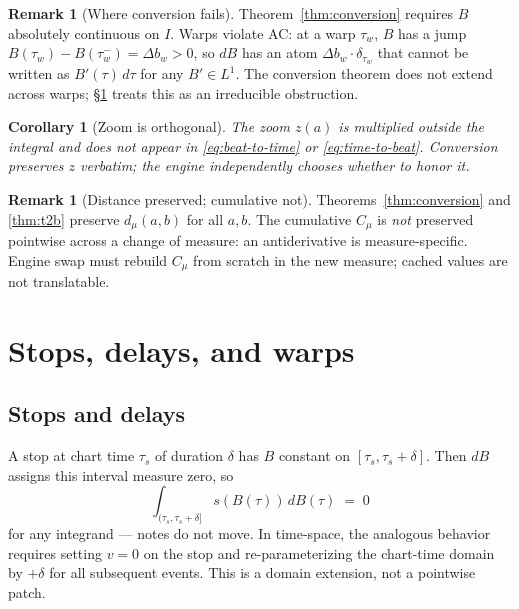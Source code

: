 \documentclass[11pt]{article}
\newtheorem{corollary}[theorem]{Corollary}
\theoremstyle{definition}
\newtheorem{remark}[theorem]{Remark}
\newcommand{\dB}{\,dB}
\newcommand{\dtau}{\,d\tau}
\newcommand{\Lone}{L^{1}}
\begin{document}
\begin{remark}[Where conversion fails]
\label{rem:conv-fails}
Theorem~\ref{thm:conversion} requires $B$ absolutely continuous on $I$.
Warps violate AC: at a warp $\tau_w$, $B$ has a jump
$B(\tau_w) - B(\tau_w^-) = \Delta b_w > 0$, so $dB$ has an atom
$\Delta b_w \cdot \delta_{\tau_w}$ that cannot be written as $B'(\tau)\dtau$
for any $B' \in \Lone$. The conversion theorem does not extend across warps;
\S\ref{sec:stops-warps} treats this as an irreducible obstruction.
\end{remark}

\begin{corollary}[Zoom is orthogonal]
\label{cor:z-ortho}
The zoom $z(a)$ is multiplied outside the integral and does not appear in
\eqref{eq:beat-to-time} or \eqref{eq:time-to-beat}. Conversion preserves $z$
verbatim; the engine independently chooses whether to honor it.
\end{corollary}

\begin{remark}[Distance preserved; cumulative not]
\label{rem:cum-not-invariant}
Theorems~\ref{thm:conversion} and \ref{thm:t2b} preserve $d_\mu(a, b)$ for all
$a, b$. The cumulative $C_\mu$ is \emph{not} preserved pointwise across a
change of measure: an antiderivative is measure-specific. Engine swap must
rebuild $C_\mu$ from scratch in the new measure; cached values are not
translatable.
\end{remark}

\section{Stops, delays, and warps}
\label{sec:stops-warps}

\subsection{Stops and delays}

A stop at chart time $\tau_s$ of duration $\delta$ has $B$ constant on
$[\tau_s, \tau_s + \delta]$. Then $dB$ assigns this interval measure zero, so
\[
\int_{(\tau_s, \tau_s + \delta]} s(B(\tau))\dB(\tau) \;=\; 0
\]
for any integrand --- notes do not move. In time-space, the analogous behavior
requires setting $v = 0$ on the stop and re-parameterizing the chart-time
domain by $+\delta$ for all subsequent events. This is a domain extension, not
a pointwise patch.
\end{document}
